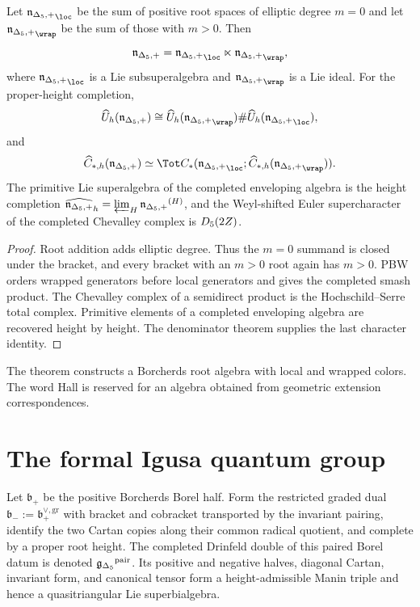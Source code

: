 \begin{theorem}
Let $\nIg_{\loc}$ be the sum of positive root spaces of elliptic degree $m=0$ and let $\nIg_{\wrap}$ be the sum of those with $m>0$.  Then
\[
 \nIg=\nIg_{\loc}\ltimes\nIg_{\wrap},
\]
where $\nIg_{\loc}$ is a Lie subsuperalgebra and $\nIg_{\wrap}$ is a Lie ideal.  For the proper-height completion,
\[
 \widehat U_h(\nIg)
 \cong
 \widehat U_h(\nIg_{\wrap})\#\widehat U_h(\nIg_{\loc}),
\]
and
\[
 \widehat C_{*,h}(\nIg)
 \simeq
 \Tot C_*(\nIg_{\loc};\widehat C_{*,h}(\nIg_{\wrap})).
\]
The primitive Lie superalgebra of the completed enveloping algebra is the height completion $\widehat{{\mathfrak n_{\Delta_5,+}}}_h=\varprojlim_H{\mathfrak n_{\Delta_5,+}}^{(H)}$, and the Weyl-shifted Euler supercharacter of the completed Chevalley complex is ${D_5}(2Z)$.
\end{theorem}
\begin{proof}
Root addition adds elliptic degree.  Thus the $m=0$ summand is closed under the bracket, and every bracket with an $m>0$ root again has $m>0$.  PBW orders wrapped generators before local generators and gives the completed smash product.  The Chevalley complex of a semidirect product is the Hochschild--Serre total complex.  Primitive elements of a completed enveloping algebra are recovered height by height.  The denominator theorem supplies the last character identity.
\end{proof}

\begin{remark}
The theorem constructs a Borcherds root algebra with local and wrapped colors.  The word Hall is reserved for an algebra obtained from geometric extension correspondences.
\end{remark}

\chapter{The formal Igusa quantum group}
Let $\mathfrak b_+$ be the positive Borcherds Borel half.  Form the restricted graded dual $\mathfrak b_-:=\mathfrak b_+^{\vee,\mathrm{gr}}$ with bracket and cobracket transported by the invariant pairing, identify the two Cartan copies along their common radical quotient, and complete by a proper root height.  The completed Drinfeld double of this paired Borel datum is denoted ${\mathfrak g_{\Delta_5}}^{\mathrm{pair}}$.  Its positive and negative halves, diagonal Cartan, invariant form, and canonical tensor form a height-admissible Manin triple and hence a quasitriangular Lie superbialgebra.

